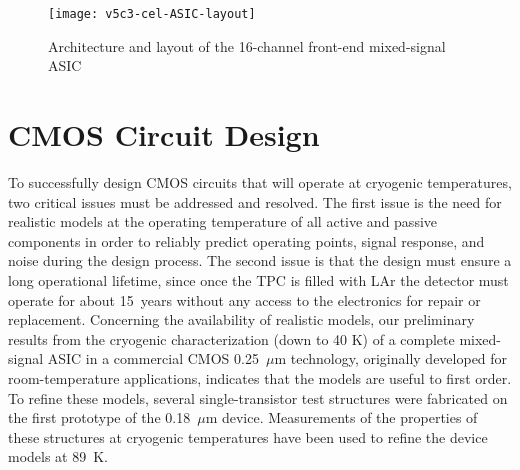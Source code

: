 \begin{figure}[htbp]
\centering
\texttt{[image: v5c3-cel-ASIC-layout]}
\caption{Architecture and layout of the 16-channel front-end mixed-signal ASIC}
\label{fig:elec_asic_layout}
\end{figure}

%
%

\section{CMOS Circuit Design}
\label{sec:fe_CMOS}

To successfully design CMOS circuits that will operate at cryogenic 
temperatures, two critical issues must be addressed and resolved. 
The first issue is the need for realistic models at the operating temperature 
of all active and passive components in order to reliably predict operating points,
signal response, and noise during the design process.
The second issue is that the design must ensure a long operational lifetime, since once the TPC is filled 
with LAr the detector must operate for about 15~years without any access to the 
electronics for repair or replacement.
Concerning the availability of realistic models, 
our preliminary results from the cryogenic characterization (down to 40 K) of a complete 
mixed-signal ASIC \cite{CMOS-Compton} in a commercial CMOS 0.25~$\mu$m technology, 
originally developed for room-temperature applications, indicates that the models 
are useful to first order.
To refine these models, several 
single-transistor test structures were fabricated on the first prototype of the 0.18~$\mu$m device. 
Measurements of the properties of these structures at cryogenic temperatures 
have been used to refine the device models at 89~K. 

